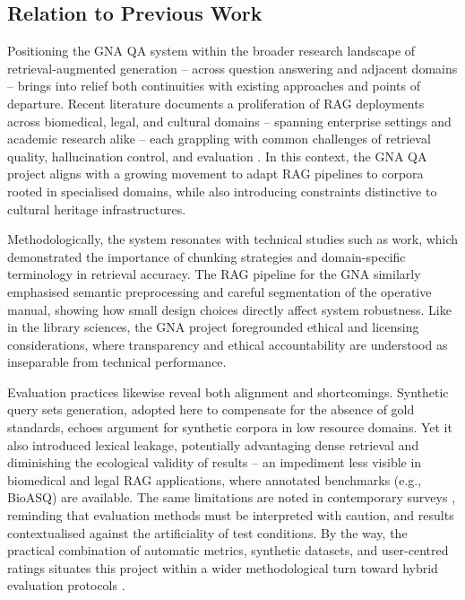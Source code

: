 \begin{spacing}{1.5}
\section{Relation to Previous Work}
Positioning the GNA QA system within the broader research landscape of retrieval-augmented generation -- across question answering and adjacent domains -- brings into relief both continuities with existing approaches and points of departure. Recent literature documents a proliferation of RAG deployments across biomedical, legal, and cultural domains -- spanning enterprise settings and academic research alike -- each grappling with common challenges of retrieval quality, hallucination control, and evaluation \citep{agarwal_litllm_2025,bevara_prospects_2025,soman_observations_2024}. In this context, the GNA QA project aligns with a growing movement to adapt RAG pipelines to corpora rooted in specialised domains, while also introducing constraints distinctive to cultural heritage infrastructures.

Methodologically, the system resonates with technical studies such as \citet{soman_observations_2024} work, which demonstrated the importance of chunking strategies and domain-specific terminology in retrieval accuracy. The RAG pipeline for the GNA similarly emphasised semantic preprocessing and careful segmentation of the operative manual, showing how small design choices directly affect system robustness. Like \citet{bevara_prospects_2025} in the library sciences, the GNA project foregrounded ethical and licensing considerations, where transparency and ethical accountability are understood as inseparable from technical performance.

Evaluation practices likewise reveal both alignment and shortcomings. Synthetic query sets generation, adopted here to compensate for the absence of gold standards, echoes \citet{bor-woei_generative_2024} argument for synthetic corpora in low resource domains. Yet it also introduced lexical leakage, potentially advantaging dense retrieval and diminishing the ecological validity of results -- an impediment less visible in biomedical and legal RAG applications, where annotated benchmarks (e.g., BioASQ) are available. The same limitations are noted in contemporary surveys \citep{yue_survey_2025}, reminding that evaluation methods must be interpreted with caution, and results contextualised against the artificiality of test conditions. By the way, the practical combination of automatic metrics, synthetic datasets, and user-centred ratings situates this project within a wider methodological turn toward hybrid evaluation protocols \citep{abeysinghe_challenges_2024,gupta_comprehensive_2024}.


\end{spacing}
